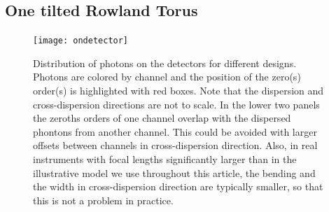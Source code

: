 \documentclass[linenumbers]{aastex631}
\begin{document}
\subsection{One tilted Rowland Torus}


\begin{figure}
    \centering
    \texttt{[image: ondetector]}
    \caption{Distribution of photons on the detectors for different designs. Photons are colored by channel and the position of the zero(s) order(s) is highlighted with red boxes. Note that the dispersion and cross-dispersion directions are not to scale. In the lower two panels the zeroths orders of one channel overlap with the dispersed phontons from another channel. This could be avoided with larger offsets between channels in cross-dispersion direction. Also, in real instruments with focal lengths significantly larger than in the illustrative model we use throughout this article, the bending and the width in cross-dispersion direction are typically smaller, so that this is not a problem in practice.
        }
    \label{fig:fish}
\end{figure}
\end{document}
